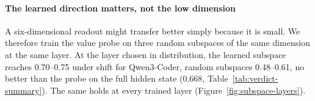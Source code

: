 \paragraph{The learned direction matters, not the low dimension}
A six-dimensional readout might transfer better simply because it is small. We
therefore train the value probe on three random subspaces of the same
dimension at the same layer. At the layer chosen in distribution, the
learned subspace reaches 0.70--0.75 under shift for Qwen3-Coder, random
subspaces 0.48--0.61, no better than the probe on the full hidden state (0.668,
Table~\ref{tab:verdict-summary}). The same holds at every trained layer (Figure~\ref{fig:subspace-layers}). 


